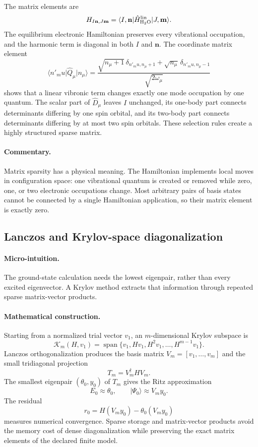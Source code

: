 \documentclass[10pt,twocolumn]{article}
\newcommand{\ket}[1]{\lvert #1\rangle}
\newcommand{\bra}[1]{\langle #1\rvert}
\newcommand{\Span}{\operatorname{span}}
\newcommand{\micro}{\paragraph{Micro-intuition.}}
\newcommand{\mathderiv}{\paragraph{Mathematical construction.}}
\newcommand{\commentaryblock}{\paragraph{Commentary.}}
\begin{document}
The matrix elements are
\begin{equation}
H_{I\mathbf n,J\mathbf m}
=\bra{I,\mathbf n}\hat H_{\rm H_2O}^{\rm lin}
\ket{J,\mathbf m}.
\label{eq:coupled-matrix-elements}
\end{equation}
The equilibrium electronic Hamiltonian preserves every vibrational
occupation, and the harmonic term is diagonal in both $I$ and $\mathbf n$.
The coordinate matrix element
\begin{equation}
\bra{n'_mu}\hat Q_\mu\ket{n_\mu}
=\frac{\sqrt{n_\mu+1}\,\delta_{n'_mu,n_\mu+1}
+\sqrt{n_\mu}\,\delta_{n'_mu,n_\mu-1}}
{\sqrt{2\omega_\mu}}
\label{eq:q-matrix-element}
\end{equation}
shows that a linear vibronic term changes exactly one mode occupation by one
quantum.  The scalar part of $\hat D_\mu$ leaves $I$ unchanged, its one-body
part connects determinants differing by one spin orbital, and its two-body
part connects determinants differing by at most two spin orbitals.  These
selection rules create a highly structured sparse matrix.

\commentaryblock Matrix sparsity has a physical meaning.  The Hamiltonian
implements local moves in configuration space: one vibrational quantum is
created or removed while zero, one, or two electronic occupations change.
Most arbitrary pairs of basis states cannot be connected by a single
Hamiltonian application, so their matrix element is exactly zero.

\subsection*{Lanczos and Krylov-space diagonalization}

\micro The ground-state calculation needs the lowest eigenpair, rather than
every excited eigenvector.  A Krylov method extracts that information through
repeated sparse matrix-vector products.

\mathderiv Starting from a normalized trial vector $v_1$, an $m$-dimensional
Krylov subspace is
\begin{equation}
\mathcal K_m(H,v_1)=\Span\{v_1,Hv_1,H^2v_1,\ldots,H^{m-1}v_1\}.
\label{eq:krylov-space}
\end{equation}
Lanczos orthogonalization produces the basis matrix
$V_m=[v_1,\ldots,v_m]$ and the small tridiagonal projection
\begin{equation}
T_m=V_m^\dagger H V_m.
\label{eq:lanczos-projection}
\end{equation}
The smallest eigenpair $(\theta_0,y_0)$ of $T_m$ gives the Ritz approximation
\begin{equation}
E_0\approx\theta_0,
\qquad
\ket{\Psi_0}\approx V_my_0.
\label{eq:ritz-pair}
\end{equation}
The residual
\begin{equation}
r_0=H(V_my_0)-\theta_0(V_my_0)
\label{eq:eigensolver-residual}
\end{equation}
measures numerical convergence.  Sparse storage and matrix-vector products
avoid the memory cost of dense diagonalization while preserving the exact
matrix elements of the declared finite model.
\end{document}
